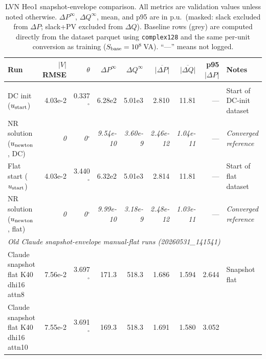 \documentclass{article}
\begin{document}
\begin{table}[h]
\centering
\caption{LVN Heo1 snapshot-envelope comparison.  All metrics are validation
  values unless noted otherwise.
  $\Delta P^\infty$, $\Delta Q^\infty$, mean, and p95 are in p.u.\
  (masked: slack excluded from $\Delta P$; slack+PV excluded from $\Delta Q$).
  Baseline rows (grey) are computed directly from the dataset parquet using
  \texttt{complex128} and the same per-unit conversion as training
  ($S_{\rm base}=10^8$\,VA).
  ``---'' means not logged.}
\label{tab:results}
\setlength{\tabcolsep}{3.5pt}
\small
\begin{tabular}{p{3.0cm}rrrrrrrp{2.0cm}}
\toprule
Run & $|V|$ RMSE & $\theta$ & $\Delta P^\infty$ & $\Delta Q^\infty$
    & $\overline{|\Delta P|}$ & $\overline{|\Delta Q|}$
    & p95 $|\Delta P|$ & Notes \\
\midrule
\rowcolor{gray!15}
\multicolumn{9}{l}{\textit{Reference baselines (snapshot-envelope, complex128, 36k cases)}} \\
\rowcolor{gray!15}
DC init ($u_{\rm start}$)
  & 4.03e-2 & 0.337\ensuremath{^\circ} & 6.28e2 & 5.01e3 & 2.810 & 11.81 & ---
  & Start of DC-init dataset \\
\rowcolor{gray!15}
NR solution ($u_{\rm newton}$, DC)
  & \textit{0} & \textit{0\ensuremath{^\circ}} & \textit{9.54e-10} & \textit{3.60e-9}
  & \textit{2.46e-12} & \textit{1.04e-11} & ---
  & \textit{Converged reference} \\
\rowcolor{gray!15}
Flat start ($u_{\rm start}$)
  & 4.03e-2 & 3.440\ensuremath{^\circ} & 6.32e2 & 5.01e3 & 2.814 & 11.81 & ---
  & Start of flat dataset \\
\rowcolor{gray!15}
NR solution ($u_{\rm newton}$, flat)
  & \textit{0} & \textit{0\ensuremath{^\circ}} & \textit{9.99e-10} & \textit{3.18e-9}
  & \textit{2.48e-12} & \textit{1.03e-11} & ---
  & \textit{Converged reference} \\
\midrule
\multicolumn{9}{l}{\textit{Old Claude snapshot-envelope manual-flat runs (20260531\_141541)}} \\[2pt]
\rowcolor{neutralblue}
Claude snapshot flat
  \newline\quad K40 dhi16 attn8
  & 7.56e-2 & 3.697\ensuremath{^\circ} & 171.3 & 518.3
  & 1.686 & 1.594 & 2.644
  & Snapshot flat \\[3pt]
\rowcolor{neutralblue}
Claude snapshot flat
  \newline\quad K40 dhi16 attn10
  & 7.55e-2 & 3.691\ensuremath{^\circ} & 169.3 & 518.3
  & 1.691 & 1.580 & 3.052

\end{tabular}
\end{table}
\end{document}
